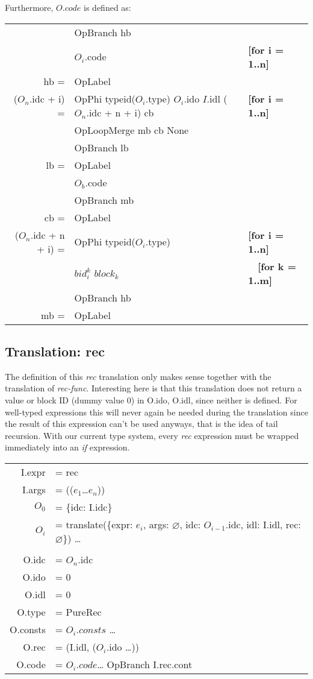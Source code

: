 \documentclass[letterpaper,12pt]{article}
\begin{document}
\medskip

Furthermore, $O.code$ is defined as: \\
\begin{tabularx}{\linewidth}{rll}
	&OpBranch hb \\
	&$O_i$.code & \textbf{[for i = 1..n]} \\
	\cline{1-2}
	hb = &OpLabel \\
	($O_n$.idc + i) = &OpPhi\: typeid($O_i$.type) $O_i$.ido $I$.idl ($O_n$.idc + n + i) cb & \textbf{[for i = 1..n]} \\
	&OpLoopMerge mb cb None \\
	&OpBranch lb \\
	\cline{1-2}
	lb = &OpLabel \\
	&$O_b$.code \\
	&OpBranch mb \\
	\cline{1-2}
	cb = &OpLabel \\
	($O_n$.idc + n + i) = &OpPhi typeid($O_i$.type) & \textbf{[for i = 1..n]} \\
		&\quad $bid_i^k$ $block_k$ & $\quad$\textbf{[for k = 1..m]} \\
	&OpBranch hb \\
	\cline{1-2}
	mb = &OpLabel
\end{tabularx}


\subsection{Translation: rec}

The definition of this \textit{rec} translation only makes sense together
with the translation of \textit{rec-func}. Interesting here is that
this translation does not return a value or block ID (dummy value 0) in 
O.ido, O.idl, since neither is defined.
For well-typed expressions this will never again be needed during
the translation since the result of this expression can't be used
anyways, that is the idea of tail recursion.
With our current type system, every \textit{rec} expression must be wrapped
immediately into an \textit{if} expression.

\medskip
\begin{tabularx}{\linewidth}{rl}
	I.expr &= rec \\
	I.args &= (($e_1$\dots$e_n$)) \\
	$O_0$ &= \{idc: I.idc\} \\
	$O_i$ &= translate(\{expr: $e_i$, args: $\varnothing$, idc: $O_{i - 1}$.idc, idl: I.idl, rec: $\varnothing$\}) \dots \\
	\\
	O.idc &= $O_n$.idc \\
	O.ido &= 0 \\ 
	O.idl &= 0 \\
	O.type &= PureRec \\
	O.consts &= $O_i.consts$ \dots \\
	O.rec &= (I.idl, ($O_i$.ido \dots)) \\
	O.code &= $O_i.code$\dots \: OpBranch I.rec.cont \\
\end{tabularx}
\end{document}
